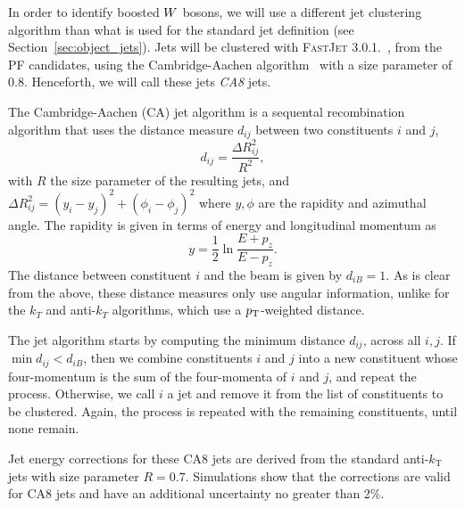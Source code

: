 In order to identify boosted $W$ bosons,  we will use a different jet clustering algorithm
than what is used for the standard jet definition (see Section~\ref{sec:object_jets}). 
Jets will be clustered with \textsc{FastJet 3.0.1.}~\cite{Cacciari:2011ma}, from the PF candidates,
using the Cambridge-Aachen algorithm~\cite{Dokshitzer:1997in} with a size parameter of 0.8.
Henceforth, we will call these jets \textit{CA8} jets. 

\begin{cajet} \theoremstyle{definition}
The Cambridge-Aachen (CA) jet algorithm is a sequental recombination algorithm that uses the
distance measure $d_{ij}$ between two constituents $i$ and $j$,
\begin{equation}
d_{ij} = \frac{\Delta R_{ij}^2}{R^2}, \label{eq:CA_distance}
\end{equation}
with $R$ the size parameter of the resulting jets, and $\Delta R_{ij}^2 = (y_i - y_j)^2 + (\phi_i -
\phi_j)^2$ where $y, \phi$ are the rapidity and azimuthal angle. The rapidity is given in terms of
energy and longitudinal momentum as
\begin{equation}
  y = \frac{1}{2} \ln{\frac{ E + p_z }{ E - p_z }} .
\end{equation}
The distance between constituent $i$ and the beam is given by $d_{iB} = 1$.
As is clear from the above, these distance measures only use angular information, unlike for the
$k_T$ and anti-$k_T$ algorithms, which use a $p_{\mathrm{T}}$-weighted distance. 

The jet algorithm starts by computing the minimum distance $d_{ij}$, across all $i,j$. If $\min
d_{ij} < d_{iB}$, then we combine constituents $i$ and $j$ into a new constituent whose
four-momentum is the sum of the four-momenta of $i$ and $j$, and repeat the process. Otherwise, we
call $i$ a jet and remove it from the list of constituents to be clustered. Again, the process is
repeated with the remaining constituents, until none remain.
\end{cajet}

Jet energy corrections for these CA8 jets are derived from the standard anti-$k_\textrm{T}$ jets
with size parameter $R=0.7$. Simulations show that the corrections are valid for CA8 jets and
have an additional uncertainty no greater than 2\%.  


